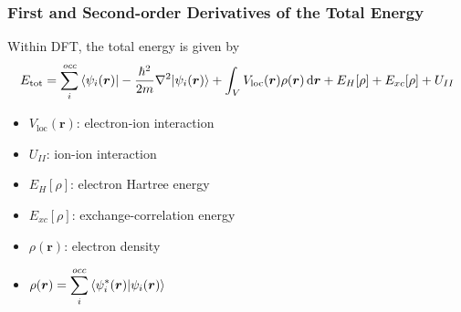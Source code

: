 \begin{frame}
  \frametitle{First and Second-order Derivatives of the Total Energy}
  Within DFT, the total energy is given by
  \begin{equation*}
    E_{\text{tot}} =
    \sum_{i}^{\textit{occ}}
    \braket{
      \psi_i(\boldsymbol{r})
      |-{\hbar^2\over2m}\nabla^2 |
      \psi_i(\boldsymbol{r})
    }
    +
    \int_{\tikzmark{int_space}V} V_{\text{loc}}(\boldsymbol{r}) \rho(\boldsymbol{r}) \,\mathrm{d}\boldsymbol{r}
    +
    E_H[\rho]
    +
    E_{xc}[\rho]
    +
    U_{II}
  \end{equation*}


  \begin{multicols}{2}
    \begin{itemize}
      \item $V_{\text{loc}}(\boldsymbol{r})$: electron-ion interaction
      \item $U_{II}$: ion-ion interaction
      \item $E_H[\rho]$: electron Hartree energy
      \item $E_{xc}[\rho]$: exchange-correlation energy
      \item $\rho(\boldsymbol{r})$: electron density
      \item[] $\displaystyle \rho(\boldsymbol{r}) = \sum_i^{occ} \braket{\psi_i^*(\boldsymbol{r}) |
          \psi_i(\boldsymbol{r})}$
    \end{itemize}
  \end{multicols}


\end{frame}

